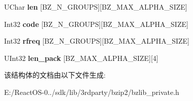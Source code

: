 \begin{DoxyCompactItemize}
U\+Char {\bfseries len} \mbox{[}B\+Z\+\_\+\+N\+\_\+\+G\+R\+O\+U\+PS\mbox{]}\mbox{[}B\+Z\+\_\+\+M\+A\+X\+\_\+\+A\+L\+P\+H\+A\+\_\+\+S\+I\+ZE\mbox{]}
\item 
\mbox{\label{struct_e_state_a138b520fed9d5bbb10d830f1f4e4dab1}} 
Int32 {\bfseries code} \mbox{[}B\+Z\+\_\+\+N\+\_\+\+G\+R\+O\+U\+PS\mbox{]}\mbox{[}B\+Z\+\_\+\+M\+A\+X\+\_\+\+A\+L\+P\+H\+A\+\_\+\+S\+I\+ZE\mbox{]}
\item 
\mbox{\label{struct_e_state_a9a925e22f64a78c4a1080c66ffa0ef62}} 
Int32 {\bfseries rfreq} \mbox{[}B\+Z\+\_\+\+N\+\_\+\+G\+R\+O\+U\+PS\mbox{]}\mbox{[}B\+Z\+\_\+\+M\+A\+X\+\_\+\+A\+L\+P\+H\+A\+\_\+\+S\+I\+ZE\mbox{]}
\item 
\mbox{\label{struct_e_state_a2ab0ad3f8a3bb1b6e03977a26c2b64af}} 
U\+Int32 {\bfseries len\+\_\+pack} \mbox{[}B\+Z\+\_\+\+M\+A\+X\+\_\+\+A\+L\+P\+H\+A\+\_\+\+S\+I\+ZE\mbox{]}\mbox{[}4\mbox{]}
\end{DoxyCompactItemize}


该结构体的文档由以下文件生成\+:\begin{DoxyCompactItemize}
\item 
E\+:/\+React\+O\+S-\/0../sdk/lib/3rdparty/bzip2/bzlib\+\_\+private.\+h\end{DoxyCompactItemize}
